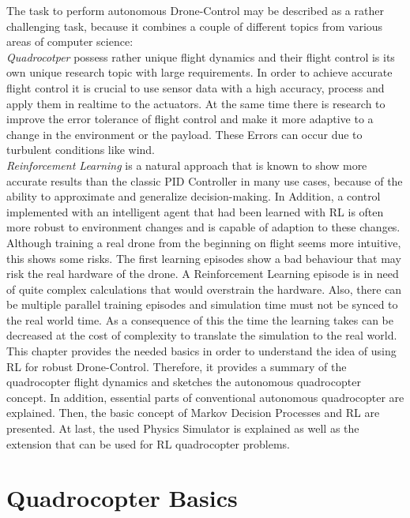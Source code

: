 The task to perform autonomous Drone-Control may be described as a rather challenging task, 
because it combines a couple of different topics from various areas of computer science:\\
\emph{Quadrocotper} possess rather unique flight dynamics and their flight control is its own unique research topic with large requirements. 
In order to achieve accurate flight control it is crucial to use sensor data with a high accuracy, process and apply them in realtime to the actuators. 
At the same time there is research to improve the error tolerance of flight control and make it more adaptive to a change in the environment or the payload. These Errors can occur due to turbulent conditions like wind.\\
\emph{Reinforcement Learning} is a natural approach that is known to show more accurate results than the classic PID Controller in many use cases, 
because of the ability to approximate and generalize decision-making. 
In Addition, a control implemented with an intelligent agent that had been learned with RL 
is often more robust to environment changes and is capable of adaption to these changes. \\
Although training a real drone from the beginning on flight seems more intuitive, this shows some risks. 
The first learning episodes show a bad behaviour that may risk the real hardware of the drone. 
A Reinforcement Learning episode is in need of quite complex calculations that would overstrain the hardware. 
Also, there can be multiple parallel training episodes and simulation time must not be synced to the real world time. 
As a consequence of this the time the learning takes can be decreased at the cost of complexity to translate the simulation to the real world.\\
\newline
This chapter provides the needed basics in order to understand the idea of using RL for robust Drone-Control. 
Therefore, it provides a summary of the quadrocopter flight dynamics and sketches the autonomous quadrocopter concept. 
In addition, essential parts of conventional autonomous quadrocopter are explained. 
Then, the basic concept of Markov Decision Processes and RL are presented. 
At last, the used Physics Simulator is explained as well as the extension that can be used for RL quadrocopter problems.

\newpage


\section{Quadrocopter Basics}

